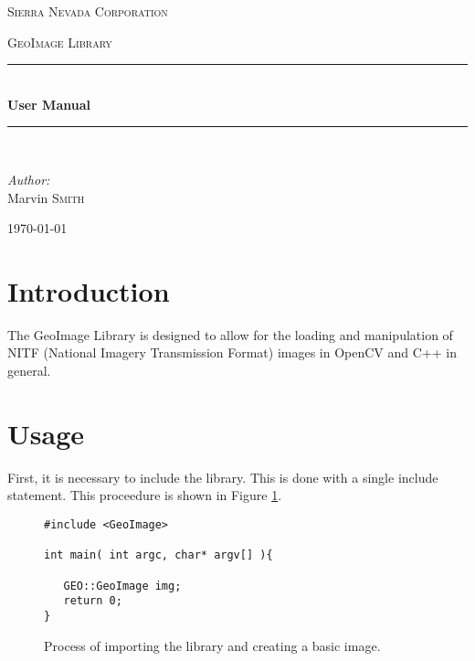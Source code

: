 \documentclass[10pt]{report}
\newcommand{\HRule}{\rule{\linewidth}{0.5mm}}
\begin{document}
\begin{titlepage}
\begin{center}

\vspace{10mm}

\textsc{\LARGE Sierra Nevada Corporation}\\[1.5cm]

\vspace{80mm}

\textsc{\Large GeoImage Library}\\[0.5cm]

\vspace{10mm}

\HRule \\[0.4cm]
{ \huge \bfseries User Manual}\\[0.4cm]

\HRule \\[1.5cm]

\begin{minipage}{0.4\textwidth}
\begin{center} \large
\emph{Author:}\\
Marvin \textsc{Smith}
\end{center}
\end{minipage}
\vfill
{\large \today}
\end{center}
\end{titlepage}
\newpage

\section*{Introduction}

The GeoImage Library is designed to allow for the loading and manipulation 
of NITF (National Imagery Transmission Format) images in OpenCV and C++ in
general.

\section*{Usage}

First, it is necessary to include the library.  This is done with a single
include statement. This proceedure is shown in Figure \ref{fig:basic01}. 


\begin{figure}[!h]
\begin{lstlisting}
#include <GeoImage>

int main( int argc, char* argv[] ){
   
   GEO::GeoImage img;
   return 0;
}

\end{lstlisting}
\caption{Process of importing the library and creating a basic image.}
\label{fig:basic01}
\end{figure}
\end{document}
